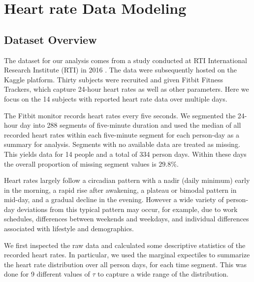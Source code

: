 \documentclass{article}
\begin{document}
\section{Heart rate Data Modeling}

\subsection{Dataset Overview}
The dataset for our analysis comes from a study conducted at RTI International Research Institute (RTI) in 2016 \cite{furberg_2016_53894}.  The data were subsequently hosted on the Kaggle platform.   Thirty subjects were recruited and given Fitbit Fitness Trackers, which capture 24-hour heart rates as well as other parameters.  Here we focus on the 14 subjects with reported heart rate data over multiple days.

The Fitbit monitor records heart rates every five seconds.  We segmented the 24-hour day into 288 segments of five-minute duration and used the median of all recorded heart rates within each five-minute segment for each person-day as a summary for analysis.  Segments with no available data are treated as missing.  This yields data for 14 people and a total of 334 person days.  Within these days the overall proportion of missing segment values is $29.8\%$.

Heart rates largely follow a circadian pattern with a nadir (daily minimum) early in the morning, a rapid rise after awakening, a plateau or bimodal pattern in mid-day, and a gradual decline in the evening.  However a wide variety of person-day deviations from this typical pattern may occur, for example, due to work schedules, differences between weekends and weekdays, and individual differences associated with lifestyle and demographics.

We first inspected the raw data and calculated some descriptive statistics of the recorded heart rates.  In particular, we used the marginal expectiles to summarize the heart rate distribution over all person days, for each time segment.  This was done for 9 different values of $\tau$ to capture a wide range of the distribution.
\end{document}
